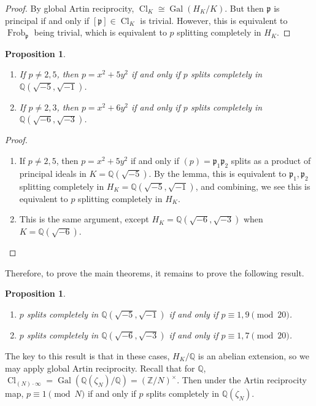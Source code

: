 \documentclass[leqno, openany]{memoir}
\newtheorem{prop}[thm]{Proposition}
\theoremstyle{definition}
\theoremstyle{remark}
\theoremstyle{plain}
\theoremstyle{definition}
\theoremstyle{remark}
\newcommand{\Z}{\mathbb{Z}}
\newcommand{\Q}{\mathbb{Q}}
\newcommand{\mf}[1]{\mathfrak{#1}}
\DeclareMathOperator{\Gal}{Gal}
\DeclareMathOperator{\Cl}{Cl}
\DeclareMathOperator{\Frob}{Frob}
\begin{document}
\begin{proof} By global Artin reciprocity, $\Cl_K \cong \Gal(H_K/K)$. But then
    $\mf{p}$ is principal if and only if $[\mf{p}] \in \Cl_K$ is trivial.
    However, this is equivalent to $\Frob_{\mf{p}}$ being trivial, which is
    equivalent to $p$ splitting completely in $H_K$.  \end{proof}

\begin{prop}\leavevmode \begin{enumerate} \item If $p \neq 2,5$, then $p = x^2
    + 5y^2$ if and only if $p$ splits completely in $\Q(\sqrt{-5}, \sqrt{-1})$.
\item If $p \neq 2,3$, then $p = x^2 + 6y^2$ if and only if $p$ splits
    completely in $\Q(\sqrt{-6}, \sqrt{-3})$.  \end{enumerate} \end{prop}

\begin{proof}\leavevmode \begin{enumerate} \item If $p \neq 2,5$, then $p = x^2
    + 5y^2$ if and only if $(p) = \mf{p}_1 \mf{p}_2$ splits as a product of
    principal ideals in $K = \Q(\sqrt{-5})$. By the lemma, this is equivalent
    to $\mf{p}_1, \mf{p}_2$ splitting completely in $H_K = \Q(\sqrt{-5},
    \sqrt{-1})$, and combining, we see this is equivalent to $p$ splitting
    completely in $H_K$.  \item This is the same argument, except $H_K =
    \Q(\sqrt{-6}, \sqrt{-3})$ when $K = \Q(\sqrt{-6})$. \qedhere
    \end{enumerate} \end{proof}

Therefore, to prove the main theorems, it remains to prove the following
result.  \begin{prop}\leavevmode \begin{enumerate} \item $p$ splits completely
    in $\Q(\sqrt{-5}, \sqrt{-1})$ if and only if $p \equiv 1,9 \pmod{20}$.
\item $p$ splits completely in $\Q(\sqrt{-6}, \sqrt{-3})$ if and only if $p
    \equiv 1,7 \pmod{20}$.  \end{enumerate} \end{prop}

The key to this result is that in these cases, $H_K/\Q$ is an abelian
extension, so we may apply global Artin reciprocity. Recall that for $\Q$,
$\Cl_{(N) \cdot \infty} = \Gal(\Q(\zeta_N) / \Q) = {(\Z/N)}^{\times}$. Then
under the Artin reciprocity map, $p \equiv 1 \pmod N$ if and only if $p$ splits
completely in $\Q(\zeta_N)$.
\end{document}
